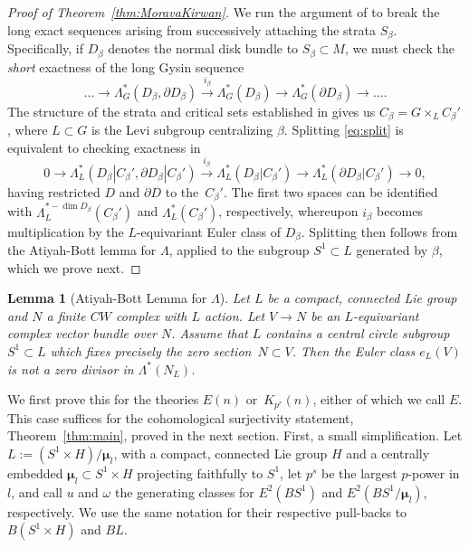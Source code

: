\documentclass[11pt, reqno]{amsart}
\theoremstyle{plain}
\newtheorem{lem}[thm]{Lemma}
\theoremstyle{definition}
\newcommand{\landw}{\Lambda}
\newcommand{\En}{\widehat{E}(n)}
\begin{document}
\begin{proof} [Proof of Theorem~\ref{thm:MoravaKirwan}]
We  run the argument of \cite[Theorem 5.4]{Kirwan} to break the long exact sequences arising from 
successively attaching the strata $S_\beta$. Specifically, if $D_\beta$  
denotes the normal  disk bundle to $S_\beta\subset M$, we must check the \emph{short} exactness of the long Gysin 
sequence 
\begin{equation}\label{eq:split}
\dots \to \landw_G^*(D_\beta,\partial D_\beta) \xrightarrow{\ i_\beta\ }   \landw_G^*(D_\beta) \to  
\landw_G^*(\partial D_\beta) \to \dots.
\end{equation}
The structure of the strata and critical sets established in \cite{Kirwan} gives us $C_\beta = G\times_L C_\beta'$, 
where $L\subset G$ is the Levi subgroup centralizing $\beta$. Splitting \eqref{eq:split} is equivalent to checking exactness in  
\[
0 \to \landw_L^*(D_\beta | C_\beta', \partial D_\beta | C_\beta')  \xrightarrow{\ i_\beta\ }   
	\landw_L^*(D_\beta | C_\beta') \to  \landw_L^*(\partial D_\beta | C_\beta') \to 0,
\]
having restricted $D$ and $\partial D$ to the~$C_\beta'$. The first two spaces can be identified with $\landw^{*-\dim D_\beta}_L(C_\beta')$ 
and $\landw^*_L(C_\beta')$, respectively, whereupon $i_\beta$ becomes multiplication by the $L$-equivariant 
Euler class of $D_\beta$. Splitting then follows from the Atiyah-Bott lemma for $\landw$, applied to the 
subgroup $S^1\subset L$ generated by $\beta$, which we prove next.
\end{proof}

\begin{lem} [Atiyah-Bott Lemma for $\landw$] \label{lem:AtiyahBott1} 
Let $L$ be a compact, connected Lie group and $N$ a finite $CW$ complex with $L$ action.  
Let $V\to N$ be an $L$-equivariant complex vector bundle over $N$.   Assume that $L$ contains 
a central circle subgroup $S^1 \subset L$ which fixes precisely the zero section~$N \subset V$.  Then the Euler class $e_L(V)$ is not a zero divisor in  $\landw^*(N_L)$.  
\end{lem} 

\noindent
We first prove this for the theories $\En$ or~$K_{p^r}(n)$, either of which we call $E$. This case suffices 
for the cohomological surjectivity statement, Theorem~\ref{thm:main}, proved in the next section. 
First, a small simplification. Let $L:= (S^1 \times H)/\boldsymbol{\mu}_l$, with a compact,  
connected Lie group $H$ and a centrally embedded 
$\boldsymbol{\mu}_l\subset S^1 \times H$ 
projecting faithfully to $S^1$, let $p^s$ be the largest $p$-power in $l$, and call $u$ and $\omega$ 
the generating classes for $E^2(BS^1)$ and $E^2(BS^1/\boldsymbol{\mu}_l)$, respectively. 
We use the same notation for their respective pull-backs to $B(S^1\times H)$ and $BL$.
\end{document}
